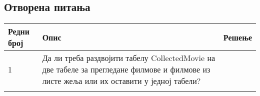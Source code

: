\subsection{Отворена питања}

\noindent
\setcellgapes{4pt}
\makegapedcells
\begin{tabularx}{\linewidth}{|l|X|X|}
    \hline
    \textbf{Редни број} & \textbf{Опис} & \textbf{Решење} \\
    \hline
    1 & Да ли треба раздвојити табелу CollectedMovie на две табеле за прегледане филмове и филмове из листе жеља или их оставити у једној табели? & \\
    \hline
    & & \\
    \hline
\end{tabularx}
